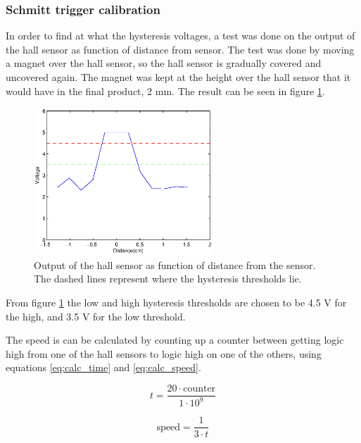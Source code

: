 \subsubsection{Schmitt trigger calibration}
In order to find at what the hysteresis voltages, a test was done on the output of the hall sensor as function of distance from sensor.
The test was done by moving a magnet over the hall sensor, so the hall sensor is gradually covered and uncovered again. The magnet was kept at the height over the hall sensor that it would have in the final product, 2 mm. 
The result can be seen in figure \ref{fig:hall_out}.

\begin{figure}
 \centering
 \includegraphics[width=0.6\textwidth]{img/hall_out}
 \caption{Output of the hall sensor as function of distance from the sensor. The dashed lines represent where the hysteresis thresholds lie.}
 \label{fig:hall_out}
\end{figure}

From figure \ref{fig:hall_out} the low and high hysteresis thresholds are chosen to be 4.5 V for the high, and 3.5 V for the low threshold.


The speed is can be calculated by counting up a counter between getting logic high from one of the hall sensors to  logic high on one of the others, using equations  \ref{eq:calc_time} and \ref{eq:calc_speed}.

\begin{equation} \label{eq:calc_time}
 t = \frac{20\cdot \text{counter}}{1\cdot 10^9}
\end{equation}

\begin{equation} \label{eq:calc_speed}
 \text{speed} = \frac{1}{3\cdot t}
\end{equation}

